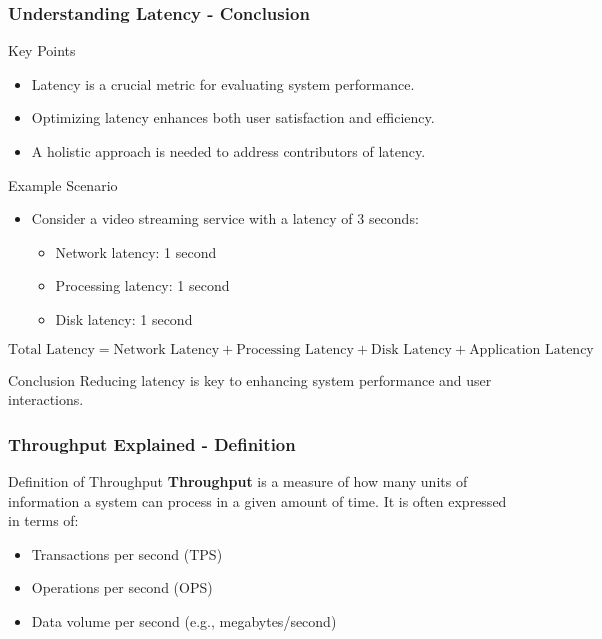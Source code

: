 \documentclass[aspectratio=169]{beamer}
\begin{document}
\begin{frame}[fragile]
    \frametitle{Understanding Latency - Conclusion}
    \begin{block}{Key Points}
        \begin{itemize}
            \item Latency is a crucial metric for evaluating system performance.
            \item Optimizing latency enhances both user satisfaction and efficiency.
            \item A holistic approach is needed to address contributors of latency.
        \end{itemize}
    \end{block}
    
    \begin{block}{Example Scenario}
        \begin{itemize}
            \item Consider a video streaming service with a latency of 3 seconds:
                \begin{itemize}
                    \item Network latency: 1 second
                    \item Processing latency: 1 second
                    \item Disk latency: 1 second
                \end{itemize}
        \end{itemize}
    \end{block}
    
    \begin{equation}
        \text{Total Latency} = \text{Network Latency} + \text{Processing Latency} + \text{Disk Latency} + \text{Application Latency}
    \end{equation}
    
    \begin{block}{Conclusion}
        Reducing latency is key to enhancing system performance and user interactions.
    \end{block}
\end{frame}

\begin{frame}[fragile]
    \frametitle{Throughput Explained - Definition}
    \begin{block}{Definition of Throughput}
        \textbf{Throughput} is a measure of how many units of information a system can process in a given amount of time. 
        It is often expressed in terms of:
        \begin{itemize}
            \item Transactions per second (TPS)
            \item Operations per second (OPS)
            \item Data volume per second (e.g., megabytes/second)
        \end{itemize}
    \end{block}
\end{frame}
\end{document}
